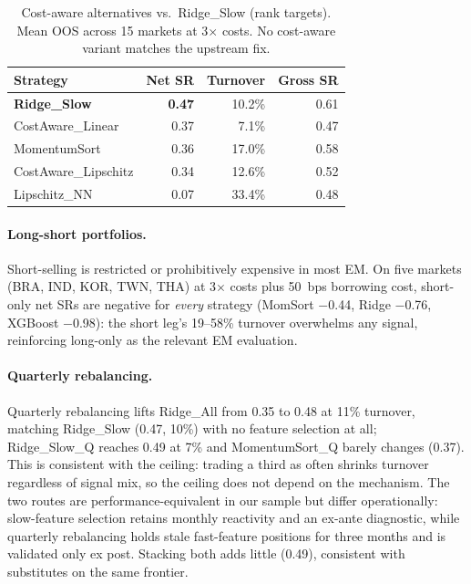 \documentclass[sigconf,balance=false]{acmart}
\begin{document}
\begin{table}[t]
\centering
\caption{Cost-aware alternatives vs.\ Ridge\_Slow (rank targets).
Mean OOS across 15 markets at 3$\times$ costs. No cost-aware
variant matches the upstream fix.}
\label{tab:cost_aware_nn}
\small
\begin{tabular}{@{}lrrr@{}}
\toprule
Strategy & Net SR & Turnover & Gross SR \\
\midrule
\textbf{Ridge\_Slow}        & \textbf{0.47} & 10.2\% & 0.61 \\
CostAware\_Linear   & 0.37 & 7.1\%  & 0.47 \\
MomentumSort        & 0.36 & 17.0\% & 0.58 \\
CostAware\_Lipschitz & 0.34 & 12.6\% & 0.52 \\
Lipschitz\_NN       & 0.07 & 33.4\% & 0.48 \\
\bottomrule
\end{tabular}
\end{table}

\paragraph{Long-short portfolios.}
Short-selling is restricted or prohibitively expensive in most EM.
On five markets (BRA, IND, KOR, TWN, THA) at 3$\times$ costs plus
50~bps borrowing cost, short-only net SRs are negative for
\emph{every} strategy (MomSort $-$0.44, Ridge $-$0.76, XGBoost
$-$0.98): the short leg's 19--58\% turnover overwhelms any signal,
reinforcing long-only as the relevant EM evaluation.

\paragraph{Quarterly rebalancing.}
Quarterly rebalancing lifts Ridge\_All from 0.35 to 0.48 at 11\%
turnover, matching Ridge\_Slow (0.47, 10\%) with no feature
selection at all; Ridge\_Slow\_Q reaches 0.49 at 7\% and
MomentumSort\_Q barely changes (0.37). This is consistent with the
ceiling: trading a third as often shrinks turnover regardless of
signal mix, so the ceiling does not depend on the mechanism. The two routes are performance-equivalent in our
sample but differ operationally: slow-feature selection retains
monthly reactivity and an ex-ante diagnostic, while quarterly
rebalancing holds stale fast-feature positions for three months and
is validated only ex post. Stacking both adds little (0.49),
consistent with substitutes on the same frontier.
\end{document}

